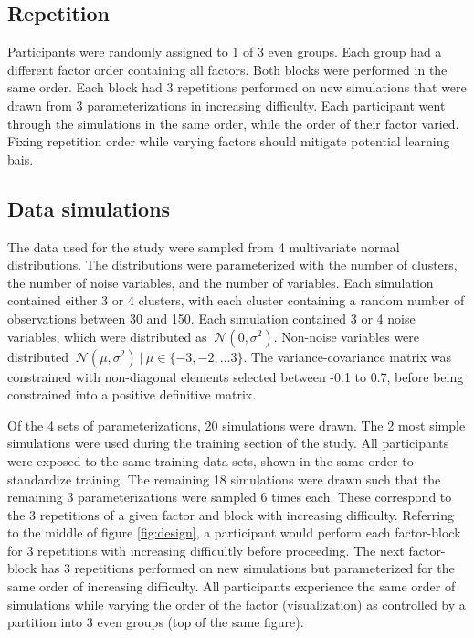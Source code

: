 \documentclass[]{article}
\begin{document}
\hypertarget{sec:reps}{%
\subsection{Repetition}\label{sec:reps}}

Participants were randomly assigned to 1 of 3 even groups. Each group
had a different factor order containing all factors. Both blocks were
performed in the same order. Each block had 3 repetitions performed on
new simulations that were drawn from 3 parameterizations in increasing
difficulty. Each participant went through the simulations in the same
order, while the order of their factor varied. Fixing repetition order
while varying factors should mitigate potential learning bais.

\hypertarget{sec:sim}{%
\subsection{Data simulations}\label{sec:sim}}

The data used for the study were sampled from 4 multivariate normal
distributions. The distributions were parameterized with the number of
clusters, the number of noise variables, and the number of variables.
Each simulation contained either 3 or 4 clusters, with each cluster
containing a random number of observations between 30 and 150. Each
simulation contained 3 or 4 noise variables, which were distributed as
\(~ \mathcal{N}(0, \sigma^2)\). Non-noise variables were distributed
\(~ \mathcal{N}(\mu, \sigma^2)~|~\mu\in \{-3, -2, ... 3\}\). The
variance-covariance matrix was constrained with non-diagonal elements
selected between -0.1 to 0.7, before being constrained into a positive
definitive matrix.

Of the 4 sets of parameterizations, 20 simulations were drawn. The 2
most simple simulations were used during the training section of the
study. All participants were exposed to the same training data sets,
shown in the same order to standardize training. The remaining 18
simulations were drawn such that the remaining 3 parameterizations were
sampled 6 times each. These correspond to the 3 repetitions of a given
factor and block with increasing difficulty. Referring to the middle of
figure \ref{fig:design}, a participant would perform each factor-block
for 3 repetitions with increasing difficultly before proceeding. The
next factor-block has 3 repetitions performed on new simulations but
parameterized for the same order of increasing difficulty. All
participants experience the same order of simulations while varying the
order of the factor (visualization) as controlled by a partition into 3
even groups (top of the same figure).
\end{document}
